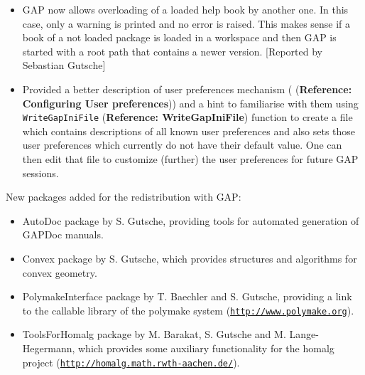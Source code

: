 \documentclass[a4paper,11pt]{report}
\begin{document}
{{\begin{itemize}
produce different strings. 
\item  \textsf{GAP} now allows overloading of a loaded help book by another one. In this case,
only a warning is printed and no error is raised. This makes sense if a book
of a not loaded package is loaded in a workspace and then \textsf{GAP} is started with a root path that contains a newer version. [Reported by
Sebastian Gutsche] 
\item  Provided a better description of user preferences mechanism ( (\textbf{Reference: Configuring User preferences})) and a hint to familiarise with them using \texttt{WriteGapIniFile} (\textbf{Reference: WriteGapIniFile}) function to create a file which contains descriptions of all known user
preferences and also sets those user preferences which currently do not have
their default value. One can then edit that file to customize (further) the
user preferences for future \textsf{GAP} sessions. 
\end{itemize}
 New packages added for the redistribution with \textsf{GAP}: 
\begin{itemize}
\item  \textsf{AutoDoc} package by S. Gutsche, providing tools for automated generation of \textsf{GAPDoc} manuals. 
\item  \textsf{Convex} package by S. Gutsche, which provides structures and algorithms for convex
geometry. 
\item  \textsf{PolymakeInterface} package by T. Baechler and S. Gutsche, providing a link to the callable
library of the \textsf{polymake} system (\href{http://www.polymake.org} {\texttt{http://www.polymake.org}}). 
\item  \textsf{ToolsForHomalg} package by M. Barakat, S. Gutsche and M. Lange-Hegermann, which provides some
auxiliary functionality for the \textsf{homalg} project (\href{http://homalg.math.rwth-aachen.de/} {\texttt{http://homalg.math.rwth-aachen.de/}}). 
\end{itemize}
 }

 
}
\end{document}
